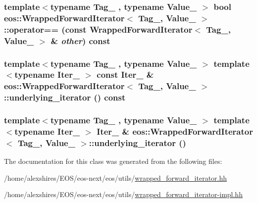 \label{classeos_1_1WrappedForwardIterator_a73f420f7f9bcc8bf8ad1286f7d5f9601}
\hypertarget{classeos_1_1WrappedForwardIterator_a79398c29c6f5012a3c882db8cf61d091}{
\subsubsection[{operator==}]{\setlength{\rightskip}{0pt plus 5cm}template$<$typename Tag\_\- , typename Value\_\- $>$ bool {\bf eos::WrappedForwardIterator}$<$ Tag\_\-, Value\_\- $>$::operator== (const {\bf WrappedForwardIterator}$<$ Tag\_\-, Value\_\- $>$ \& {\em other}) const}}
\label{classeos_1_1WrappedForwardIterator_a79398c29c6f5012a3c882db8cf61d091}
\hypertarget{classeos_1_1WrappedForwardIterator_a41c259a3f5e5d206c87ecb9dfeb41dec}{
\subsubsection[{underlying\_\-iterator}]{\setlength{\rightskip}{0pt plus 5cm}template$<$typename Tag\_\- , typename Value\_\- $>$ template$<$typename Iter\_\- $>$ const Iter\_\- \& {\bf eos::WrappedForwardIterator}$<$ Tag\_\-, Value\_\- $>$::underlying\_\-iterator () const}}
\label{classeos_1_1WrappedForwardIterator_a41c259a3f5e5d206c87ecb9dfeb41dec}
\hypertarget{classeos_1_1WrappedForwardIterator_a5dd5d4d179b339a647660a0e4289a67c}{
\subsubsection[{underlying\_\-iterator}]{\setlength{\rightskip}{0pt plus 5cm}template$<$typename Tag\_\- , typename Value\_\- $>$ template$<$typename Iter\_\- $>$ Iter\_\- \& {\bf eos::WrappedForwardIterator}$<$ Tag\_\-, Value\_\- $>$::underlying\_\-iterator ()}}
\label{classeos_1_1WrappedForwardIterator_a5dd5d4d179b339a647660a0e4289a67c}


The documentation for this class was generated from the following files:\begin{DoxyCompactItemize}
\item 
/home/alexshires/EOS/eos-\/next/eos/utils/\hyperlink{wrapped__forward__iterator_8hh}{wrapped\_\-forward\_\-iterator.hh}\item 
/home/alexshires/EOS/eos-\/next/eos/utils/\hyperlink{wrapped__forward__iterator-impl_8hh}{wrapped\_\-forward\_\-iterator-\/impl.hh}\end{DoxyCompactItemize}
